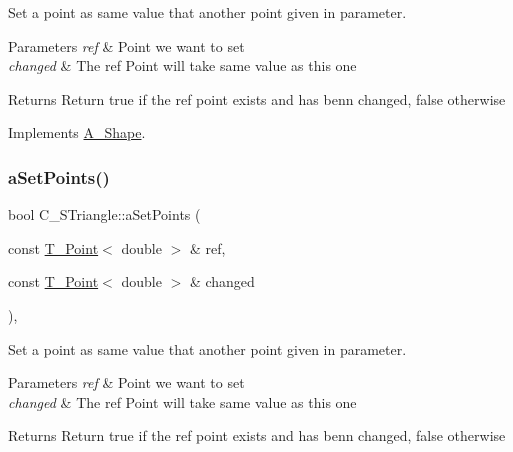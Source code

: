Set a point as same value that another point given in parameter. 


\begin{DoxyParams}{Parameters}
{\em ref} & Point we want to set \\
\hline
{\em changed} & The ref Point will take same value as this one \\
\hline
\end{DoxyParams}
\begin{DoxyReturn}{Returns}
Return true if the ref point exists and has benn changed, false otherwise 
\end{DoxyReturn}


Implements \hyperlink{classA__Shape_a6996f454b337f8425ad13cba3f7a7c35}{A\+\_\+\+Shape}.

\mbox{\label{classC__STriangle_a431802d5e10b69f535e7929a23963b5e}} 
\subsubsection{\texorpdfstring{a\+Set\+Points()}{aSetPoints()}\hspace{0.1cm}{\footnotesize\ttfamily [2/2]}}
{\footnotesize\ttfamily bool C\+\_\+\+S\+Triangle\+::a\+Set\+Points (\begin{DoxyParamCaption}\item[{const \hyperlink{classT__Point}{T\+\_\+\+Point}$<$ double $>$ \&}]{ref,  }\item[{const \hyperlink{classT__Point}{T\+\_\+\+Point}$<$ double $>$ \&}]{changed }\end{DoxyParamCaption})\hspace{0.3cm}{\ttfamily [override]}, {\ttfamily [virtual]}}



Set a point as same value that another point given in parameter. 


\begin{DoxyParams}{Parameters}
{\em ref} & Point we want to set \\
\hline
{\em changed} & The ref Point will take same value as this one \\
\hline
\end{DoxyParams}
\begin{DoxyReturn}{Returns}
Return true if the ref point exists and has benn changed, false otherwise 
\end{DoxyReturn}


